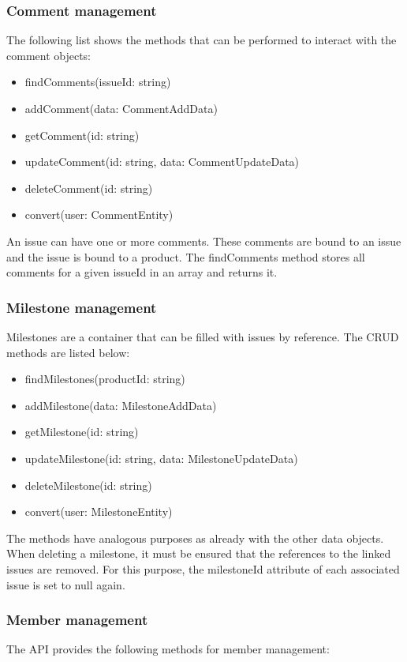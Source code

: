     \subsubsection*{Comment management}
    The following list shows the methods that can be performed to interact with the comment objects:
    \begin{itemize}
        \item findComments(issueId: string)
        \item addComment(data: CommentAddData)
        \item getComment(id: string)
        \item updateComment(id: string, data: CommentUpdateData)
        \item deleteComment(id: string)
        \item convert(user: CommentEntity)
    \end{itemize}

    An issue can have one or more comments. These comments are bound to an issue and the issue is bound to a product. The findComments method stores all comments for a given issueId in an array and returns it. 

    \subsubsection*{Milestone management}
    Milestones are a container that can be filled with issues by reference. The CRUD methods are listed below:
    \begin{itemize}
        \item findMilestones(productId: string)
        \item addMilestone(data: MilestoneAddData)
        \item getMilestone(id: string)
        \item updateMilestone(id: string, data: MilestoneUpdateData)
        \item deleteMilestone(id: string)
        \item convert(user: MilestoneEntity)
    \end{itemize}

    The methods have analogous purposes as already with the other data objects. When deleting a milestone, it must be ensured that the references to the linked issues are removed. For this purpose, the milestoneId attribute of each associated issue is set to null again.

    \subsubsection*{Member management}
    The API provides the following methods for member management:


